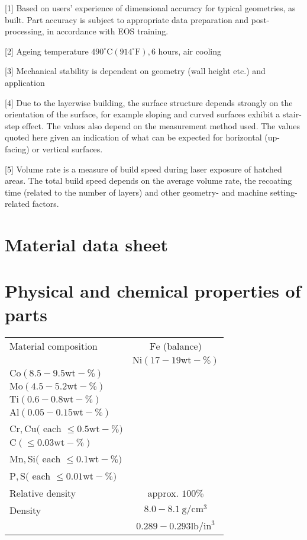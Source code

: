 \documentclass[10pt]{article}
\begin{document}
[1] Based on users' experience of dimensional accuracy for typical geometries, as built. Part accuracy is subject to appropriate data preparation and post-processing, in accordance with EOS training.

[2] Ageing temperature $490^{\circ} \mathrm{C}\left(914^{\circ} \mathrm{F}\right), 6$ hours, air cooling

[3] Mechanical stability is dependent on geometry (wall height etc.) and application

[4] Due to the layerwise building, the surface structure depends strongly on the orientation of the surface, for example sloping and curved surfaces exhibit a stair-step effect. The values also depend on the measurement method used. The values quoted here given an indication of what can be expected for horizontal (up-facing) or vertical surfaces.

[5] Volume rate is a measure of build speed during laser exposure of hatched areas. The total build speed depends on the average volume rate, the recoating time (related to the number of layers) and other geometry- and machine setting-related factors.

\section*{Material data sheet}
\section*{Physical and chemical properties of parts}
\begin{center}
\begin{tabular}{lc}
\hline
Material composition & $\mathrm{Fe}$ (balance) \\
 & $\mathrm{Ni}(17-19 \mathrm{wt}-\%)$ \\
$\mathrm{Co}(8.5-9.5 \mathrm{wt}-\%)$ &  \\
$\mathrm{Mo}(4.5-5.2 \mathrm{wt}-\%)$ &  \\
$\mathrm{Ti}(0.6-0.8 \mathrm{wt}-\%)$ &  \\
$\mathrm{Al}(0.05-0.15 \mathrm{wt}-\%)$ &  \\
$\mathrm{Cr}, \mathrm{Cu}($ each $\leq 0.5 \mathrm{wt}-\%)$ &  \\
$\mathrm{C}(\leq 0.03 \mathrm{wt}-\%)$ &  \\
$\mathrm{Mn}, \mathrm{Si}($ each $\leq 0.1 \mathrm{wt}-\%)$ &  \\
$\mathrm{P}, \mathrm{S}($ each $\leq 0.01 \mathrm{wt}-\%)$ &  \\
\hline
Relative density & approx. $100 \%$ \\
\hline
Density & $8.0-8.1 \mathrm{~g} / \mathrm{cm}^{3}$ \\
 & $0.289-0.293 \mathrm{lb} / \mathrm{in}^{3}$ \\
\hline
\end{tabular}
\end{center}
\end{document}
